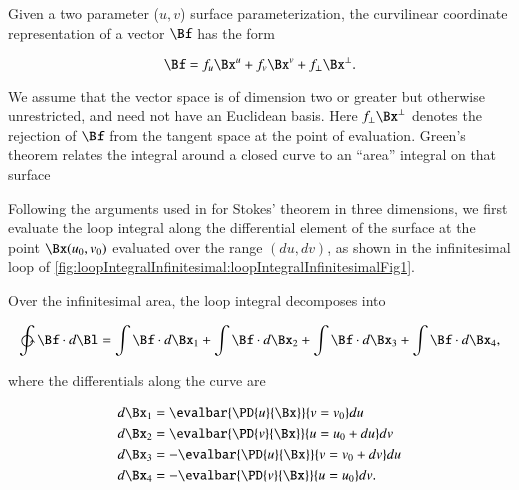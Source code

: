 %
%
Given a two parameter (\(u,v\)) surface parameterization, the curvilinear coordinate representation of a vector \(\Bf\) has the form

\begin{dmath}\label{eqn:stokesTheoremGeometricAlgebra:1640}
\Bf = f_u \Bx^u + f_v \Bx^v + f_\perp \Bx^\perp.
\end{dmath}

We assume that the vector space is of dimension two or greater but otherwise unrestricted, and need not have an Euclidean basis.
Here \(f_\perp \Bx^\perp\) denotes the rejection of \(\Bf\) from the tangent space at the point of evaluation.
Green's theorem relates the integral around a closed curve to an ``area'' integral on that surface


Following the arguments used in \citep{schwartz1987pe} for Stokes' theorem in three dimensions, we first evaluate the loop integral along the differential element of the surface at the point \(\Bx(u_0, v_0)\) evaluated over the range \((du, dv)\), as shown in the infinitesimal loop of \cref{fig:loopIntegralInfinitesimal:loopIntegralInfinitesimalFig1}.


Over the infinitesimal area, the loop integral decomposes into

\begin{dmath}\label{eqn:stokesTheoremGeometricAlgebra:1700}
\ointctrclockwise \Bf \cdot d\Bl
=
\int \Bf \cdot d\Bx_1
+\int \Bf \cdot d\Bx_2
+\int \Bf \cdot d\Bx_3
+\int \Bf \cdot d\Bx_4,
\end{dmath}

where the differentials along the curve are

\begin{dmath}\label{eqn:stokesTheoremGeometricAlgebra:1600}
\begin{aligned}
d\Bx_1 &= \evalbar{ \PD{u}{\Bx} }{v = v_0} du \\
d\Bx_2 &= \evalbar{ \PD{v}{\Bx} }{u = u_0 + du} dv \\
d\Bx_3 &= -\evalbar{ \PD{u}{\Bx} }{v = v_0 + dv} du \\
d\Bx_4 &= -\evalbar{ \PD{v}{\Bx} }{u = u_0} dv.
\end{aligned}
\end{dmath}

